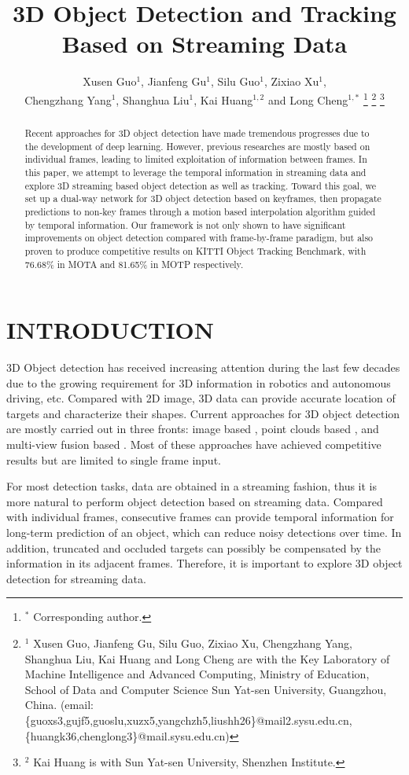 \documentclass[letterpaper, 10pt, conference]{ieeeconf}  %
\title{\LARGE \bf 3D Object Detection and Tracking Based on Streaming Data}
\author{Xusen Guo$^{1}$, Jianfeng Gu$^{1}$, Silu Guo$^{1}$, Zixiao Xu$^{1}$,\\ Chengzhang Yang$^{1}$, Shanghua Liu$^{1}$, Kai Huang$^{1,2}$ and Long Cheng$^{1,*}$
\thanks{$^{*}$ Corresponding author.}
\thanks{$^{1}$ Xusen Guo, Jianfeng Gu, Silu Guo, Zixiao Xu, Chengzhang Yang, Shanghua Liu, Kai Huang and Long Cheng are with the Key Laboratory of Machine Intelligence and Advanced Computing, Ministry of Education, School of Data and Computer Science Sun Yat-sen University, Guangzhou, China. (email:\{guoxs3,gujf5,guoslu,xuzx5,yangchzh5,liushh26\}@mail2.sysu.edu.cn, \{huangk36,chenglong3\}@mail.sysu.edu.cn)}
\thanks{$^{2}$ Kai Huang is with Sun Yat-sen University, Shenzhen Institute.}}
\begin{document}
\maketitle

\def\eg{\emph{e.g.}}
\def\Eg{\emph{E.g.}}
\def\etal{\emph{et al. }}
\def\figurename{\emph{Figure}}
\def\tablename{\emph{Table}}

\thispagestyle{empty}
\pagestyle{empty}


\begin{abstract}
Recent approaches for 3D object detection have made tremendous progresses due to the development of deep learning. However, previous researches are mostly based on individual frames, leading to limited exploitation of information between frames. In this paper, we attempt to leverage the temporal information in streaming data and explore 3D streaming based object detection as well as tracking. Toward this goal, we set up a dual-way network for 3D object detection based on keyframes, then propagate predictions to non-key frames through a motion based interpolation algorithm guided by temporal information. Our framework is not only shown to have significant improvements on object detection compared with frame-by-frame paradigm, but also proven to produce competitive results on KITTI Object Tracking Benchmark, with 76.68\% in MOTA and 81.65\% in MOTP respectively.
\end{abstract}

\section{INTRODUCTION}

3D Object detection has received increasing attention during the last few decades due to the growing requirement for 3D information in robotics and autonomous driving, etc. Compared with 2D image, 3D data can provide accurate location of targets and characterize their shapes. Current approaches for 3D object detection are mostly carried out in three fronts: image based \cite{7780605, chen20183d}, point clouds based \cite{zhou2018voxelnet,yang2018pixor,simon2018complex}, and multi-view fusion based \cite{chen2017multi,ku2018joint}. Most of these approaches have achieved competitive results but are limited to single frame input.

For most detection tasks, data are obtained in a streaming fashion, thus it is more natural to perform object detection based on streaming data. Compared with individual frames, consecutive frames can provide temporal information for long-term prediction of an object, which can reduce noisy detections over time. In addition, truncated and occluded targets can possibly be compensated by the information in its adjacent frames. Therefore, it is important to explore 3D object detection for streaming data.
\end{document}
